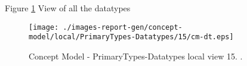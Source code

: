 Figure \ref{fig:lu.uni.lassy.excalibur.group09.spec-CM-view-local-PrimaryTypes-Datatypes-15} View of all the datatypes



\begin{figure}[htbp] 
\label{fig:lu.uni.lassy.excalibur.group09.spec-CM}
\begin{center}
\texttt{[image: ./images-report-gen/concept-model/local/PrimaryTypes-Datatypes/15/cm-dt.eps]}
\end{center}
\caption[Concept Model - PrimaryTypes-Datatypes local view 15 - ]{Concept Model - PrimaryTypes-Datatypes local view 15. .}
\label{fig:lu.uni.lassy.excalibur.group09.spec-CM-view-local-PrimaryTypes-Datatypes-15}
\end{figure}
\vspace{0.5cm} 
